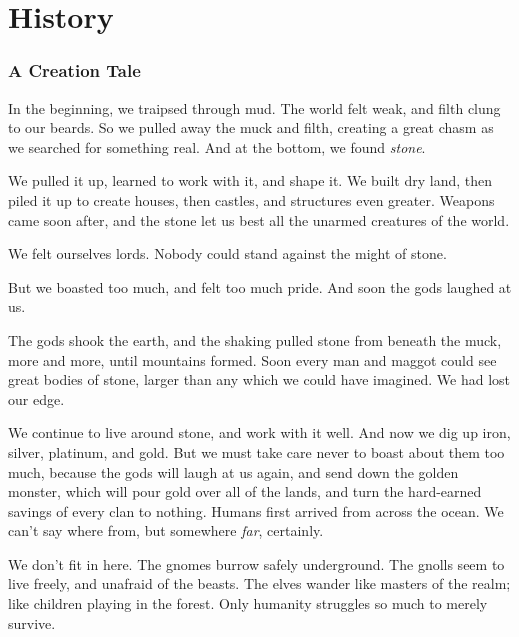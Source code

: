 \chapter{History}

\begin{multicols}{2}

\subsection{A Creation Tale}

\begin{exampletext}

\randomfour

\ifcase\value{r4}\relax\or
  \noindent
  In the beginning, we traipsed through mud.
  The world felt weak, and filth clung to our beards.
  So we pulled away the muck and filth, creating a great chasm as we searched for something real.
  And at the bottom, we found \emph{stone}.

  We pulled it up, learned to work with it, and shape it.
  We built dry land, then piled it up to create houses, then castles, and structures even greater.
  Weapons came soon after, and the stone let us best all the unarmed creatures of the world.

  We felt ourselves lords.
  Nobody could stand against the might of stone.

  But we boasted too much, and felt too much pride.
  And soon the gods laughed at us.

  The gods shook the earth, and the shaking pulled stone from beneath the muck, more and more, until mountains formed.
  Soon every man and maggot could see great bodies of stone, larger than any which we could have imagined.
  We had lost our edge.

  We continue to live around stone, and work with it well.
  And now we dig up iron, silver, platinum, and gold.
  But we must take care never to boast about them too much, because the gods will laugh at us again, and send down the golden monster, which will pour gold over all of the lands, and turn the hard-earned savings of every clan to nothing.
\or
  Humans first arrived from across the ocean.
  We can't say where from, but somewhere \emph{far}, certainly.

  We don't fit in here.
  The gnomes burrow safely underground.
  The gnolls seem to live freely, and unafraid of the beasts.
  The elves wander like masters of the realm; like children playing in the forest.
  Only humanity struggles so much to merely survive.


\end{exampletext}
\end{multicols}
